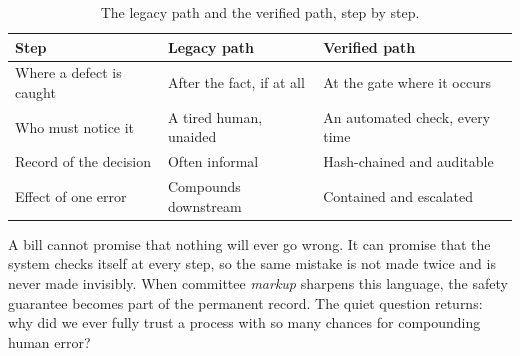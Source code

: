 \begin{table}[H]
\footnotesize
\begin{tabularx}{\textwidth}{@{}L{4.95cm} Y Y@{}}
\toprule
\textbf{Step} & \textbf{Legacy path} & \textbf{Verified path}\\
\midrule
Where a defect is caught & After the fact, if at all & At the gate where it occurs\\
Who must notice it & A tired human, unaided & An automated check, every time\\
Record of the decision & Often informal & Hash-chained and auditable\\
Effect of one error & Compounds downstream & Contained and escalated\\
\bottomrule
\end{tabularx}
\caption{The legacy path and the verified path, step by step.}
\label{tab:fear}
\end{table}

A bill cannot promise that nothing will ever go wrong. It can promise that the
system checks itself at every step, so the same mistake is not made twice and is
never made invisibly. When committee \emph{markup} sharpens this language, the
safety guarantee becomes part of the permanent record. The quiet question returns:
why did we ever fully trust a process with so many chances for compounding human
error?
